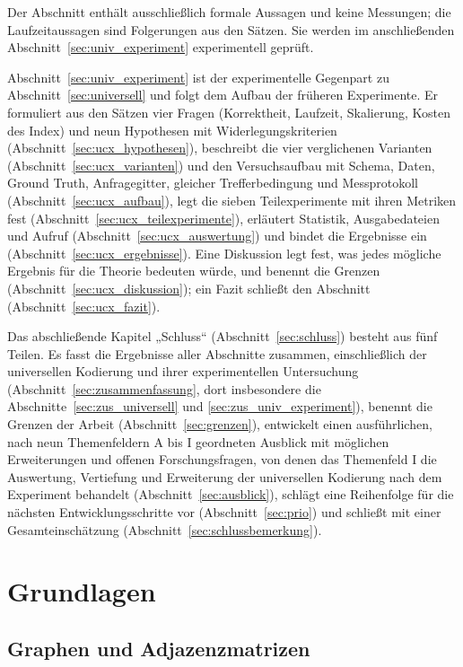 \documentclass[a4paper,12pt, twoside]{report}
\theoremstyle{definition}
\begin{document}
Der Abschnitt enthält ausschließlich formale Aussagen und keine Messungen; die Laufzeitaussagen sind Folgerungen aus den Sätzen. Sie werden im anschließenden Abschnitt~\ref{sec:univ_experiment} experimentell geprüft.

Abschnitt~\ref{sec:univ_experiment} ist der experimentelle Gegenpart zu Abschnitt~\ref{sec:universell} und folgt dem Aufbau der früheren Experimente. Er formuliert aus den Sätzen vier Fragen (Korrektheit, Laufzeit, Skalierung, Kosten des Index) und neun Hypothesen mit Widerlegungskriterien (Abschnitt~\ref{sec:ucx_hypothesen}), beschreibt die vier verglichenen Varianten (Abschnitt~\ref{sec:ucx_varianten}) und den Versuchsaufbau mit Schema, Daten, Ground Truth, Anfragegitter, gleicher Trefferbedingung und Messprotokoll (Abschnitt~\ref{sec:ucx_aufbau}), legt die sieben Teilexperimente mit ihren Metriken fest (Abschnitt~\ref{sec:ucx_teilexperimente}), erläutert Statistik, Ausgabedateien und Aufruf (Abschnitt~\ref{sec:ucx_auswertung}) und bindet die Ergebnisse ein (Abschnitt~\ref{sec:ucx_ergebnisse}). Eine Diskussion legt fest, was jedes mögliche Ergebnis für die Theorie bedeuten würde, und benennt die Grenzen (Abschnitt~\ref{sec:ucx_diskussion}); ein Fazit schließt den Abschnitt (Abschnitt~\ref{sec:ucx_fazit}).

Das abschließende Kapitel „Schluss“ (Abschnitt~\ref{sec:schluss}) besteht aus fünf Teilen. Es fasst die Ergebnisse aller Abschnitte zusammen, einschließlich der universellen Kodierung und ihrer experimentellen Untersuchung (Abschnitt~\ref{sec:zusammenfassung}, dort insbesondere die Abschnitte~\ref{sec:zus_universell} und \ref{sec:zus_univ_experiment}), benennt die Grenzen der Arbeit (Abschnitt~\ref{sec:grenzen}), entwickelt einen ausführlichen, nach neun Themenfeldern A bis I geordneten Ausblick mit möglichen Erweiterungen und offenen Forschungsfragen, von denen das Themenfeld I die Auswertung, Vertiefung und Erweiterung der universellen Kodierung nach dem Experiment behandelt (Abschnitt~\ref{sec:ausblick}), schlägt eine Reihenfolge für die nächsten Entwicklungsschritte vor (Abschnitt~\ref{sec:prio}) und schließt mit einer Gesamteinschätzung (Abschnitt~\ref{sec:schlussbemerkung}).

\chapter{Grundlagen}
\label{sec:grundlagen}

\section{Graphen und Adjazenzmatrizen}
\end{document}
